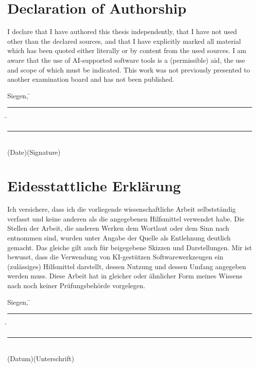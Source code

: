 
\ifenglish
\chapter*{Declaration of Authorship}
\thispagestyle{empty}

I declare that I have authored this thesis independently, that I have not used other than the declared sources, and that I have explicitly marked all material which has been quoted either literally or by content from the used sources. I am aware that the use of AI-supported software tools is a (permissible) aid, the use and scope of which must be indicated. This work was not previously presented to another examination board and has not been published.\\[8ex]


\begin{tabbing}
Siegen, \hspace{0.4cm} \= \rule[-0.15\baselineskip]{5cm}{.4pt}  \hspace{0.7cm}\= \rule[-0.15\baselineskip]{6cm}{.4pt}\\
\renewcommand{\baselinestretch}{0.5}\normalsize
\>\small{(Date)}\>\small{(Signature)}
\end{tabbing}
\renewcommand{\baselinestretch}{1}\normalsize
\fi

\ifdeutsch
\chapter*{Eidesstattliche Erklärung}
\thispagestyle{empty}

Ich versichere, dass ich die vorliegende wissenschaftliche Arbeit selbstständig verfasst
und keine anderen als die angegebenen Hilfsmittel verwendet habe. Die Stellen der
Arbeit, die anderen Werken dem Wortlaut oder dem Sinn nach entnommen sind, wurden
unter Angabe der Quelle als Entlehnung deutlich gemacht. Das gleiche gilt auch für
beigegebene Skizzen und Darstellungen. Mir ist bewusst, dass die Verwendung von KI-gestützen Softwarewerkzeugen ein (zulässiges) Hilfsmittel darstellt, dessen Nutzung und dessen Umfang angegeben werden muss. Diese Arbeit hat in gleicher oder ähnlicher Form meines Wissens nach noch keiner Prüfungsbehörde vorgelegen.
\\[8ex]
\begin{tabbing}
Siegen, \hspace{0.4cm} \= \rule[-0.15\baselineskip]{5cm}{.4pt}  \hspace{0.7cm}\= \rule[-0.15\baselineskip]{6cm}{.4pt}\\
\renewcommand{\baselinestretch}{0.5}\normalsize
\>\small{(Datum)}\>\small{(Unterschrift)}
\end{tabbing}
\renewcommand{\baselinestretch}{1}\normalsize
\fi